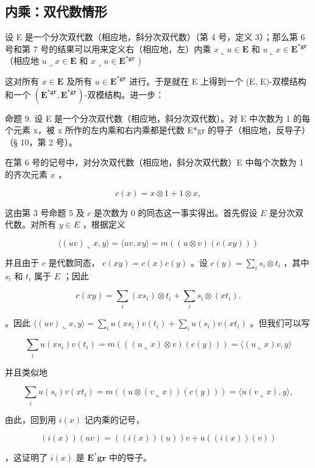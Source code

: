 \subsection{内乘：双代数情形}

设 E 是一个分次双代数（相应地，斜分次双代数）（第 4 号，定义 3）；那么第 6 号和第 7 号的结果可以用来定义右（相应地，左）内乘 \(x \llcorner u \in \mathbf{E}\) 和 \(u \llcorner x \in \mathbf{E}^{*\mathbf{gr}}\) （相应地 \(u \lrcorner x \in \mathbf{E}\) 和 \(x \lrcorner u \in \mathbf{E}^{*\mathbf{gr}}\) )

这对所有 \(x \in \mathbf{E}\) 及所有 \(u \in \mathbf{E}^{*\mathbf{gr}}\) 进行。于是就在 E 上得到一个 (E, E)-双模结构和一个 \((\mathbf{E}^{*\mathbf{gr}}, \mathbf{E}^{*\mathbf{gr}})\)-双模结构。进一步：

命题 9. 设 E 是一个分次双代数（相应地，斜分次双代数）。对 E 中次数为 1 的每个元素 x，被 x 所作的左内乘和右内乘都是代数 E*gr 的导子（相应地，反导子）（§ 10，第 2 号）。

在第 6 号的记号中，对分次双代数（相应地，斜分次双代数）E 中每个次数为 1 的齐次元素 \(x\) ，

\[
c (x) = x \otimes 1 + 1 \otimes x,
\]

这由第 3 号命题 5 及 \(c\) 是次数为 0 的同态这一事实得出。首先假设 \(E\) 是分次双代数。对所有 \(y \in E\) ，根据定义

\[
\langle (u v) \llcorner x, y \rangle = \langle u v, x y \rangle = m ((u \otimes v) (c (x y)))
\]

并且由于 \(c\) 是代数同态， \(c(xy) = c(x)c(y)\) 。设 \(c(y) = \sum_{i} s_i \otimes t_i\) ，其中 \(s_i\) 和 \(t_i\) 属于 \(E\) ；因此

\[
c (x y) = \sum_ {i} (x s _ {i}) \otimes t _ {i} + \sum_ {i} s _ {i} \otimes (x t _ {i}).
\]

。因此 \(\langle (uv) \llcorner x, y \rangle = \sum_{i} u(xs_i)v(t_i) + \sum_{i} u(s_i)v(xt_i)\) 。但我们可以写

\[
\sum_ {i} u (x s _ {i}) v (t _ {i}) = m (((u \llcorner x) \otimes v) (c (y))) = \langle (u \llcorner x) v, y \rangle
\]

并且类似地

\[
\sum_ {i} u (s _ {i}) v (x t _ {i}) = m ((u \otimes (v \llcorner x)) (c (y))) = \langle u (v \llcorner x), y \rangle ,
\]

由此，回到用 \(i(x)\) 记内乘的记号，

\[
(i (x)) (u v) = ((i (x)) (u)) v + u ((i (x)) (v))\tag{64}
\]

，这证明了 \(i(x)\) 是 \(\mathbf{E}^{*}\mathbf{gr}\) 中的导子。

